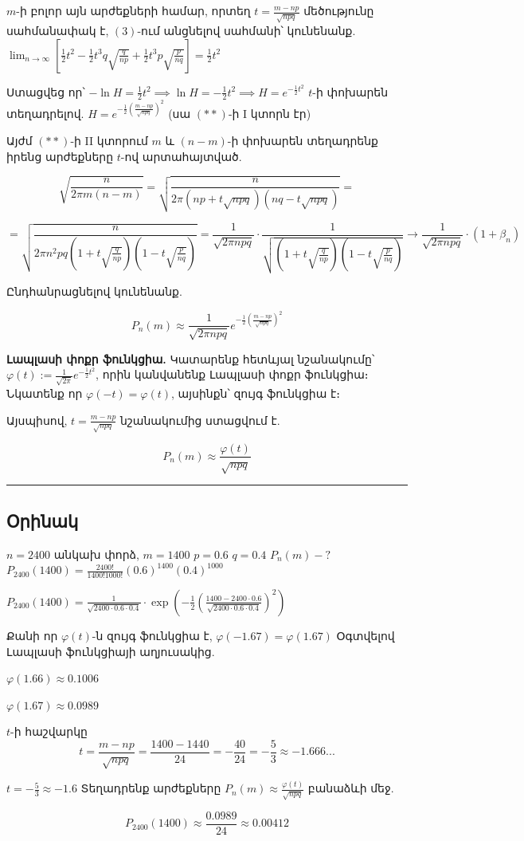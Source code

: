 \documentclass[12pt, a4paper]{article}
\begin{document}
$m$-ի բոլոր այն արժեքների համար, որտեղ $t = \frac{m-np}{\sqrt{npq}}$ մեծությունը սահմանափակ է, $(3)$-ում անցնելով սահմանի՝ կունենանք.
$\lim_{n \to \infty} \left[ \frac{1}{2} t^2 - \frac{1}{2} t^3 q \sqrt{\frac{q}{np}} + \frac{1}{2} t^3 p \sqrt{\frac{p}{nq}} \right] = \frac{1}{2} t^2$

Ստացվեց որ՝ $-\ln H = \frac{1}{2} t^2 \implies \ln H = -\frac{1}{2} t^2 \implies H = e^{-\frac{1}{2} t^2}$
$t$-ի փոխարեն տեղադրելով.
$H = e^{-\frac{1}{2} \left( \frac{m-np}{\sqrt{npq}} \right)^2}$ (սա $(**)$-ի I կտորն էր)

Այժմ $(**)$-ի II կտորում $m$ և $(n-m)$-ի փոխարեն տեղադրենք իրենց արժեքները $t$-ով արտահայտված.

$$\sqrt{\frac{n}{2\pi m(n-m)}} = \sqrt{\frac{n}{2\pi (np + t\sqrt{npq})(nq - t\sqrt{npq})}} = $$

$$= \sqrt{\frac{n}{2\pi n^2 pq (1 + t\sqrt{\frac{q}{np}})(1 - t\sqrt{\frac{p}{nq}})}} = \frac{1}{\sqrt{2\pi npq}} \cdot \frac{1}{\sqrt{(1+t\sqrt{\frac{q}{np}})(1-t\sqrt{\frac{p}{nq}})}} \to \frac{1}{\sqrt{2\pi npq}} \cdot (1 + \beta_n)$$

Ընդհանրացնելով կունենանք.

$$P_n(m) \approx \frac{1}{\sqrt{2\pi npq}} e^{-\frac{1}{2} \left( \frac{m-np}{\sqrt{npq}} \right)^2}$$

\textbf{Լապլասի փոքր ֆունկցիա.}
Կատարենք հետևյալ նշանակումը՝ $\varphi(t) := \frac{1}{\sqrt{2\pi}} e^{-\frac{1}{2} t^2}$, որին կանվանենք Լապլասի փոքր ֆունկցիա։
Նկատենք որ $\varphi(-t) = \varphi(t)$, այսինքն՝ զույգ ֆունկցիա է։

Այսպիսով, $t = \frac{m-np}{\sqrt{npq}}$ նշանակումից ստացվում է.

$$P_n(m) \approx \frac{\varphi(t)}{\sqrt{npq}}$$

\vspace{1em}
\hrule
\vspace{1em}

\subsection{Օրինակ}

$n = 2400$ անկախ փորձ, $m = 1400$
$p = 0.6$
$q = 0.4$
$P_n(m) - ?$
$P_{2400}(1400) = \frac{2400!}{1400! 1000!} (0.6)^{1400} (0.4)^{1000}$

$P_{2400}(1400) = \frac{1}{\sqrt{2400 \cdot 0.6 \cdot 0.4}} \cdot \exp \left( -\frac{1}{2} \left( \frac{1400 - 2400 \cdot 0.6}{\sqrt{2400 \cdot 0.6 \cdot 0.4}} \right)^2 \right)$

Քանի որ $\varphi(t)$-ն զույգ ֆունկցիա է, $\varphi(-1.67) = \varphi(1.67)$
Օգտվելով Լապլասի ֆունկցիայի աղյուսակից.

$\varphi(1.66) \approx 0.1006$

$\varphi(1.67) \approx 0.0989$

$t$-ի հաշվարկը
$$t = \frac{m - np}{\sqrt{npq}} = \frac{1400 - 1440}{24} = -\frac{40}{24} = -\frac{5}{3} \approx -1.666...$$

$t = -\frac{5}{3} \approx -1.6$
Տեղադրենք արժեքները $P_n(m) \approx \frac{\varphi(t)}{\sqrt{npq}}$ բանաձևի մեջ.

$$P_{2400}(1400) \approx \frac{0.0989}{24} \approx 0.00412$$
\end{document}
